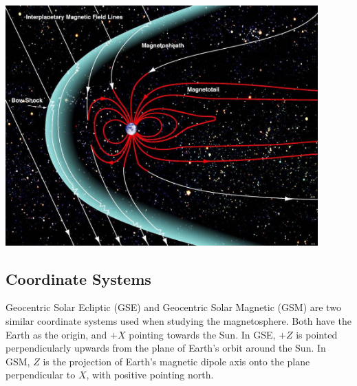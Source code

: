 \documentclass[12pt]{article}
\newenvironment{Figure}
  {\par\medskip\noindent\minipage{\linewidth}}
  {\endminipage\par\medskip}
\begin{document}
\begin{Figure}
    \begin{minipage}[c]{0.57\textwidth}
        \centering
        \includegraphics[width=0.9\textwidth]{NASA-Magnetosphere.jpeg}
    \end{minipage}
    \begin{minipage}[c]{0.4\textwidth}
        \label{fig:plasmasphere}
    \end{minipage}
\end{Figure}

\subsection{Coordinate Systems}
Geocentric Solar Ecliptic (GSE) and Geocentric Solar Magnetic (GSM) are two similar coordinate systems used when studying the magnetosphere. Both have the Earth as the origin, and $+X$ pointing towards the Sun. In GSE, $+Z$ is pointed perpendicularly upwards from the plane of Earth's orbit around the Sun. In GSM, $Z$ is the projection of Earth's magnetic dipole axis onto the plane perpendicular to $X$, with positive pointing north.
\end{document}
